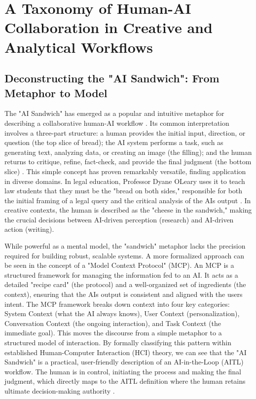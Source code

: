 \documentclass[
  12pt,
  a4paper,
  bibliography=totoc,
  numbers=noenddot
]{scrartcl}
\begin{document}
\section{A Taxonomy of Human-AI
Collaboration in Creative and Analytical
Workflows}\label{section-3-a-taxonomy-of-human-ai-collaboration-in-creative-and-analytical-workflows}

\subsection{Deconstructing the "AI
Sandwich": From Metaphor to
Model}\label{deconstructing-the-ai-sandwich-from-metaphor-to-model}

The "AI Sandwich" has emerged as a popular and intuitive metaphor for
describing a collaborative human-AI workflow \cite{nationaljurist2025ai}. Its
common interpretation involves a three-part structure: a human provides
the initial input, direction, or question (the top slice of bread); the
AI system performs a task, such as generating text, analyzing data, or
creating an image (the filling); and the human returns to critique,
refine, fact-check, and provide the final judgment (the bottom
slice) \cite{nationaljurist2025ai}. This simple concept has proven remarkably
versatile, finding application in diverse domains. In legal education,
Professor Dyane O\textquotesingle Leary uses it to teach law students
that they must be the "bread on both sides," responsible for both the
initial framing of a legal query and the critical analysis of the
AI\textquotesingle s output \cite{nationaljurist2025ai}. In creative contexts,
the human is described as the "cheese in the sandwich," making the
crucial decisions between AI-driven perception (research) and AI-driven
action (writing).\cite{medium2025symbiotic}

While powerful as a mental model, the "sandwich" metaphor lacks the
precision required for building robust, scalable systems. A more
formalized approach can be seen in the concept of a "Model Context
Protocol" (MCP).\cite{bilotta2025model} An MCP is a structured framework
for managing the information fed to an AI. It acts as a detailed "recipe
card" (the protocol) and a well-organized set of ingredients (the
context), ensuring that the AI\textquotesingle s output is consistent
and aligned with the user\textquotesingle s intent. The MCP framework
breaks down context into four key categories: System Context (what the
AI always knows), User Context (personalization), Conversation Context
(the ongoing interaction), and Task Context (the immediate
goal).\cite{bilotta2025model} This moves the discourse from a simple
metaphor to a structured model of interaction. By formally classifying
this pattern within established Human-Computer Interaction (HCI) theory,
we can see that the "AI Sandwich" is a practical, user-friendly
description of an AI-in-the-Loop (AITL) workflow. The human is in
control, initiating the process and making the final judgment, which
directly maps to the AITL definition where the human retains ultimate
decision-making authority \cite{arxiv2025human}.
\end{document}
